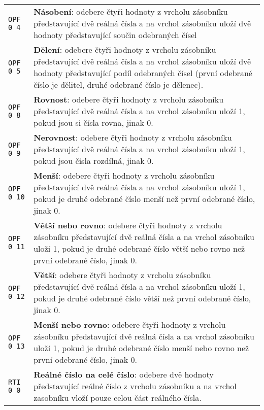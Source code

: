 \documentclass{article}
\begin{document}
\begin{longtable}{|l| p{10cm}|}
		\rule{0pt}{4ex} \texttt{OPF 0 4} & \textbf{Násobení}: odebere čtyři hodnoty z vrcholu zásobníku představující dvě reálná čísla a na vrchol zásobníku uloží dvě hodnoty představující součin odebraných čísel \\
		
		\rule{0pt}{4ex} \texttt{OPF 0 5} & \textbf{Dělení}: odebere čtyři hodnoty z vrcholu zásobníku představující dvě reálná čísla a na vrchol zásobníku uloží dvě hodnoty představující podíl odebraných čísel (první odebrané číslo je dělitel, druhé odebrané číslo je dělenec). \\		
		
		\rule{0pt}{4ex} \texttt{OPF 0 8} & \textbf{Rovnost}: odebere čtyři hodnoty z vrcholu zásobníku představující dvě reálná čísla a na vrchol zásobníku uloží 1, pokud jsou si čísla rovna, jinak 0. \\
		
		\rule{0pt}{4ex} \texttt{OPF 0 9} & \textbf{Nerovnost}: odebere čtyři hodnoty z vrcholu zásobníku představující dvě reálná čísla a na vrchol zásobníku uloží 1, pokud jsou čísla rozdílná, jinak 0. \\
		
		\rule{0pt}{4ex} \texttt{OPF 0 10} & \textbf{Menší}: odebere čtyři hodnoty z vrcholu zásobníku představující dvě reálná čísla a na vrchol zásobníku uloží 1, pokud je druhé odebrané číslo menší než první odebrané číslo, jinak 0. \\
		
		\rule{0pt}{4ex} \texttt{OPF 0 11} & \textbf{Větší nebo rovno}: odebere čtyři hodnoty z vrcholu zásobníku představující dvě reálná čísla a na vrchol zásobníku uloží 1, pokud je druhé odebrané číslo větší nebo rovno než první odebrané číslo, jinak 0. \\
		
		\rule{0pt}{4ex} \texttt{OPF 0 12} & \textbf{Větší}: odebere čtyři hodnoty z vrcholu zásobníku představující dvě reálná čísla a na vrchol zásobníku uloží 1, pokud je druhé odebrané číslo větší než první odebrané číslo, jinak 0. \\
		
		\rule{0pt}{4ex} \texttt{OPF 0 13} & \textbf{Menší nebo rovno}: odebere čtyři hodnoty z vrcholu zásobníku představující dvě reálná čísla a na vrchol zásobníku uloží 1, pokud je druhé odebrané číslo menší nebo rovno než první odebrané číslo, jinak 0. \\ \hline
		
		\rule{0pt}{3ex} \texttt{RTI 0 0} & \textbf{Reálné číslo na celé číslo}: odebere dvě hodnoty představující reálné číslo z vrcholu zásobníku a na vrchol zasobníku vloží pouze celou část reálného čísla. \\ \hline
		

\end{longtable}
\end{document}
